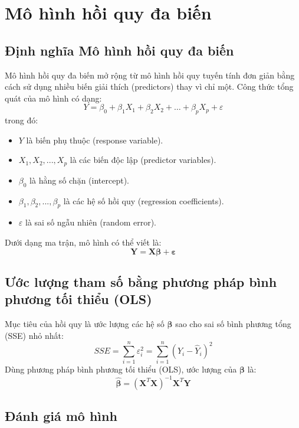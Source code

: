 \chapter{Mô hình hồi quy đa biến}
\section{Định nghĩa Mô hình hồi quy đa biến}
Mô hình hồi quy đa biến mở rộng từ mô hình hồi quy tuyến tính đơn giản bằng cách sử dụng nhiều biến giải thích (predictors) thay vì chỉ một. Công thức tổng quát của mô hình có dạng:
\begin{equation}
Y = \beta_0 + \beta_1 X_1 + \beta_2 X_2 + \dots + \beta_p X_p + \varepsilon
\end{equation}
trong đó:
\begin{itemize}
    \item $Y$ là biến phụ thuộc (response variable).
    \item $X_1, X_2, ..., X_p$ là các biến độc lập (predictor variables).
    \item $\beta_0$ là hằng số chặn (intercept).
    \item $\beta_1, \beta_2, ..., \beta_p$ là các hệ số hồi quy (regression coefficients).
    \item $\varepsilon$ là sai số ngẫu nhiên (random error).
\end{itemize}
Dưới dạng ma trận, mô hình có thể viết là:
\begin{equation}
\mathbf{Y} = \mathbf{X} \boldsymbol{\beta} + \boldsymbol{\varepsilon}
\end{equation}

\section{Ước lượng tham số bằng phương pháp bình phương tối thiểu (OLS)}
Mục tiêu của hồi quy là ước lượng các hệ số $\boldsymbol{\beta}$ sao cho sai số bình phương tổng (SSE) nhỏ nhất:
\begin{equation}
SSE = \sum_{i=1}^{n} \varepsilon_i^2 = \sum_{i=1}^{n} (Y_i - \hat{Y}_i)^2
\end{equation}
Dùng phương pháp bình phương tối thiểu (OLS), ước lượng của $\boldsymbol{\beta}$ là:
\begin{equation}
\hat{\boldsymbol{\beta}} = (\mathbf{X}^T \mathbf{X})^{-1} \mathbf{X}^T \mathbf{Y}
\end{equation}

\section{Đánh giá mô hình}
